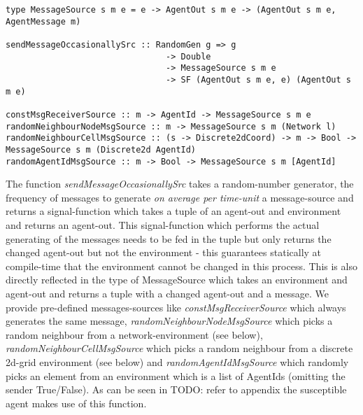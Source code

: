 \begin{verbatim}
type MessageSource s m e = e -> AgentOut s m e -> (AgentOut s m e, AgentMessage m)

sendMessageOccasionallySrc :: RandomGen g => g 
                                -> Double
                                -> MessageSource s m e 
                                -> SF (AgentOut s m e, e) (AgentOut s m e)

constMsgReceiverSource :: m -> AgentId -> MessageSource s m e
randomNeighbourNodeMsgSource :: m -> MessageSource s m (Network l)
randomNeighbourCellMsgSource :: (s -> Discrete2dCoord) -> m -> Bool -> MessageSource s m (Discrete2d AgentId)
randomAgentIdMsgSource :: m -> Bool -> MessageSource s m [AgentId]
\end{verbatim}

The function \textit{sendMessageOccasionallySrc} takes a random-number generator, the frequency of messages to generate \textit{on average per time-unit} a message-source and returns a signal-function which takes a tuple of an agent-out and environment and returns an agent-out. This signal-function which performs the actual generating of the messages needs to be fed in the tuple but only returns the changed agent-out but not the environment - this guarantees statically at compile-time that the environment cannot be changed in this process. This is also directly reflected in the type of MessageSource which takes an environment and agent-out and returns a tuple with a changed agent-out and a message. We provide pre-defined messages-sources like \textit{constMsgReceiverSource} which always generates the same message, \textit{randomNeighbourNodeMsgSource} which picks a random neighbour from a network-environment (see below), \textit{randomNeighbourCellMsgSource} which picks a random neighbour from a discrete 2d-grid environment (see below) and \textit{randomAgentIdMsgSource} which randomly picks an element from an environment which is a list of AgentIds (omitting the sender True/False).
As can be seen in TODO: refer to appendix the susceptible agent makes use of this function.

